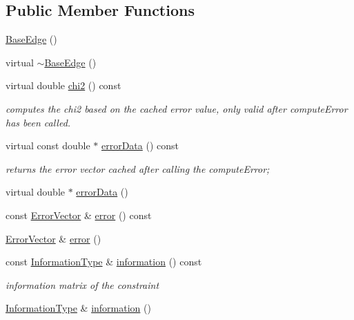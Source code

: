 \subsection*{Public Member Functions}
\begin{DoxyCompactItemize}
\item 
\hyperlink{classg2o_1_1BaseEdge_a5efd0eb7e76a7f1ad723e7a5896a54d5}{Base\+Edge} ()
\item 
virtual \hyperlink{classg2o_1_1BaseEdge_a92a5cba950b867f9ff10b8154291087c}{$\sim$\+Base\+Edge} ()
\item 
virtual double \hyperlink{classg2o_1_1BaseEdge_a7ea9406b8cc06b44433569bbd4fcefac}{chi2} () const 
\begin{DoxyCompactList}\small\item\em computes the chi2 based on the cached error value, only valid after compute\+Error has been called. \end{DoxyCompactList}\item 
virtual const double $\ast$ \hyperlink{classg2o_1_1BaseEdge_a2483ee84ebe78e35e71db7dce703edae}{error\+Data} () const 
\begin{DoxyCompactList}\small\item\em returns the error vector cached after calling the compute\+Error; \end{DoxyCompactList}\item 
virtual double $\ast$ \hyperlink{classg2o_1_1BaseEdge_ab80452c1134036928a2af6303412a3c4}{error\+Data} ()
\item 
const \hyperlink{classg2o_1_1BaseEdge_af5b558dd24e4be2e437563cae4b3550d}{Error\+Vector} \& \hyperlink{classg2o_1_1BaseEdge_a52fb082b224f30a29248431ea34e9c39}{error} () const 
\item 
\hyperlink{classg2o_1_1BaseEdge_af5b558dd24e4be2e437563cae4b3550d}{Error\+Vector} \& \hyperlink{classg2o_1_1BaseEdge_ad0a9e3b6d5490c8f4af794c77742faae}{error} ()
\item 
const \hyperlink{classg2o_1_1BaseEdge_a2e5a33343ac3f189d8a7d5ee4d8b73fc}{Information\+Type} \& \hyperlink{classg2o_1_1BaseEdge_ab682086df7223ce2b039d652416ddc23}{information} () const 
\begin{DoxyCompactList}\small\item\em information matrix of the constraint \end{DoxyCompactList}\item 
\hyperlink{classg2o_1_1BaseEdge_a2e5a33343ac3f189d8a7d5ee4d8b73fc}{Information\+Type} \& \hyperlink{classg2o_1_1BaseEdge_addff9120320d63504e07bfe17f1d04a7}{information} ()

\end{DoxyCompactItemize}
